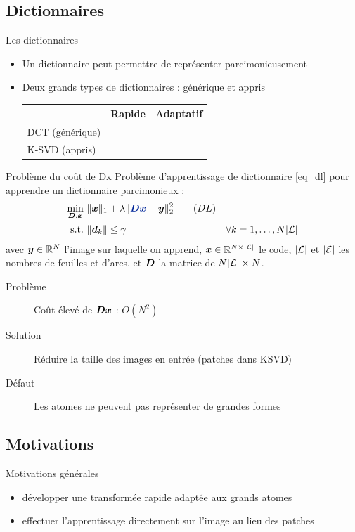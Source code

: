 \subsection{Dictionnaires}
\begin{frame}{Les dictionnaires}
\begin{itemize}
\item Un dictionnaire peut permettre de représenter parcimonieusement
\item Deux grands types de dictionnaires : générique et appris
	\begin{table}[] \centering
	\begin{tabular}{@{}lcc@{}} \toprule
	 & Rapide & Adaptatif \\ \midrule
	DCT (générique) & \cmark & \xmark\\
	K-SVD (appris) & \xmark & \cmark \\ \bottomrule
	\end{tabular}
	\end{table}
\end{itemize}
\end{frame}

\begin{frame}{Problème du coût de Dx}
Problème d'apprentissage de dictionnaire \eqref{eq_dl} pour apprendre un dictionnaire parcimonieux :
\begin{align} 
\underset{\D,\x}{\min}~ & \| \x \|_1 + \lambda \| \Beq{\D\x}-\y \|^2_2 \tag{$DL$}\label{eq_dl} \\
\text{s.t.}~ & \| \d_k \| \le \gamma & \forall k = 1,\dots,N|\L| \label{eq_dl_finite_norm} \notag
\end{align}
 avec $\bm{y} \in \mathbb{R}^N$ l'image sur laquelle on apprend, $\bm{x} \in \mathbb{R}^{N \times |\mathcal L|}$ le code, $|\mathcal L|$ et $|\mathcal E|$ les nombres de feuilles et d'arcs, et $\bm{D}$ la matrice de $N|\mathcal L| \times N$.
\begin{description}
	\item[Problème] \alert{Coût élevé} de $\bm{D}\bm{x}$ : $O(N^2)$
	\item[Solution] Réduire la taille des images en entrée (patches dans KSVD)
	\item[Défaut] Les atomes ne peuvent pas représenter de grandes formes
\end{description}
\end{frame}


\subsection{Motivations}
\begin{frame}{Motivations générales}
	\begin{itemize}
		\item développer une \alert{transformée rapide} adaptée aux grands atomes
		\item effectuer l'apprentissage \alert{directement sur l'image} au lieu des patches
	\end{itemize}
\end{frame}







